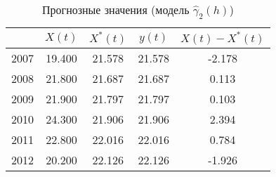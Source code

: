 \begin{table}[H]
\centering
\caption{Прогнозные значения (модель $ \widehat{\gamma}_2(h) $)} 
\label{table:lin-fit-prediction}
\begin{tabular}{r|cccc}
  \hline
 & $X(t)$ & $X^{*}(t)$ & $y(t)$ & $ X(t) - X^{*}(t) $ \\ 
  \hline
2007 & 19.400 & 21.578 & 21.578 & -2.178 \\ 
  2008 & 21.800 & 21.687 & 21.687 & 0.113 \\ 
  2009 & 21.900 & 21.797 & 21.797 & 0.103 \\ 
  2010 & 24.300 & 21.906 & 21.906 & 2.394 \\ 
  2011 & 22.800 & 22.016 & 22.016 & 0.784 \\ 
  2012 & 20.200 & 22.126 & 22.126 & -1.926 \\ 
   \hline
\end{tabular}
\end{table}
